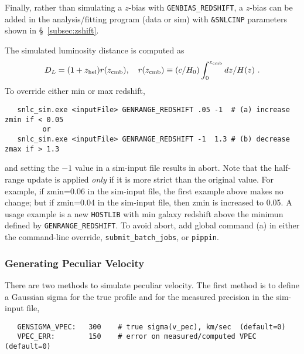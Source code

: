 \documentclass[12pt]{article}
\newcommand{\zhelio}{z_{\rm hel}}
\newcommand{\zcmb}{z_{\rm cmb}}
\begin{document}
Finally, rather than simulating a $z$-bias with {\tt GENBIAS\_REDSHIFT},
a $z$-bias can be added in the analysis/fitting program 
(data or sim) with 
{\tt \&SNLCINP} parameters shown in \S~\ref{subsec:zshift}.

\medskip
The simulated luminosity distance is computed as 
\begin{equation}
  D_L = (1+\zhelio)r(\zcmb),~~~ 
     r(\zcmb) \equiv (c/H_0)\int_0^{\zcmb} dz/H(z)~.
\end{equation}
%
\medskip
To override either min or max redshift,
\vspace{-0.4cm}
\begin{verbatim}
   snlc_sim.exe <inputFile> GENRANGE_REDSHIFT .05 -1  # (a) increase zmin if < 0.05
         or
   snlc_sim.exe <inputFile> GENRANGE_REDSHIFT -1  1.3 # (b) decrease zmax if > 1.3
\end{verbatim}
\vspace{-0.2cm}
and setting the $-1$ value in a sim-input file results in abort.
Note that the half-range update is applied {\it only} if it is more strict
than the original value.
For example, if zmin=0.06 in the sim-input file, 
the first example above makes no change; 
but if zmin=0.04 in the sim-input file, then zmin is increased to 0.05.
A usage example is a new {\tt HOSTLIB} with min galaxy redshift above
the minimun defined by {\tt GENRANGE\_REDSHIFT}.
To avoid abort, add global command (a) in either the
command-line override, {\tt submit\_batch\_jobs}, or {\tt pippin}.

\clearpage 
\subsubsection{Generating Peculiar Velocity}
\label{sss:vpec}

There are two methods to simulate peculiar velocity.
The first method is to define a Gaussian sigma for
the true profile and for the measured precision in 
the sim-input file,
\begin{verbatim}
   GENSIGMA_VPEC:   300    # true sigma(v_pec), km/sec  (default=0)
   VPEC_ERR:        150    # error on measured/computed VPEC (default=0)
\end{verbatim}
\end{document}
